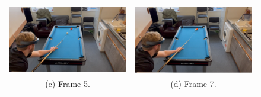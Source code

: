 \documentclass[ %
                author={Finn Alexander Wilkinson},
                supervisor={Dr. Andrew Calway},
                degree={MEng},
                title={\centering A Mixed Reality Aim Assistant for Pool and Snooker},
                subtitle={},
                type={Enterprise},
                year={2021} ]{dissertation}
\begin{document}
\begin{figure}[h!]
\begin{tabular}{cc}
         \includegraphics[scale = 0.15]{Images/Eval/Path Estimate/Cross Table/Frame 5.PNG} & \includegraphics[scale = 0.15]{Images/Eval/Path Estimate/Cross Table/Frame 7.PNG}\\ 
         (c) Frame 5. & (d) Frame 7. \\ [6pt]

\end{tabular}
\end{figure}
\end{document}
